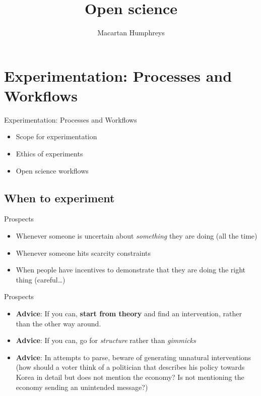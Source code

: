 \documentclass[
  11pt,
  ignorenonframetext,
]{beamer}
\title{Open science}
\author{Macartan Humphreys}
\date{}
\providecommand{\tightlist}{%
  \setlength{\itemsep}{0pt}\setlength{\parskip}{0pt}}\usepackage{longtable,booktabs,array}
\begin{document}
\frame{\titlepage}
\ifdefined\Shaded\renewenvironment{Shaded}{\begin{tcolorbox}[interior hidden, breakable, frame hidden, boxrule=0pt, sharp corners, enhanced, borderline west={3pt}{0pt}{shadecolor}]}{\end{tcolorbox}}\fi

\hypertarget{experimentation-processes-and-workflows}{%
\section{Experimentation: Processes and
Workflows}\label{experimentation-processes-and-workflows}}

\begin{frame}{Experimentation: Processes and Workflows}
\begin{itemize}
\tightlist
\item
  Scope for experimentation
\item
  Ethics of experiments
\item
  Open science workflows
\end{itemize}
\end{frame}

\hypertarget{when-to-experiment}{%
\subsection{\texorpdfstring{When to experiment
\label{L_prospects}}{When to experiment }}\label{when-to-experiment}}

\begin{frame}{Prospects}
\protect\hypertarget{prospects}{}
\begin{itemize}
\tightlist
\item
  Whenever someone is uncertain about \emph{something} they are doing
  (all the time)
\item
  Whenever someone hits scarcity constraints
\item
  When people have incentives to demonstrate that they are doing the
  right thing (careful\ldots)
\end{itemize}
\end{frame}

\begin{frame}{Prospects}
\protect\hypertarget{prospects-1}{}
\begin{itemize}
\tightlist
\item
  \textbf{Advice}: If you can, \textbf{start from theory} and find an
  intervention, rather than the other way around.
\item
  \textbf{Advice}: If you can, go for \emph{structure} rather than
  \emph{gimmicks}
\item
  \textbf{Advice}: In attempts to parse, beware of generating unnatural
  interventions (how should a voter think of a politician that describes
  his policy towards Korea in detail but does not mention the economy?
  Is not mentioning the economy sending an unintended message?)
\end{itemize}
\end{frame}
\end{document}

